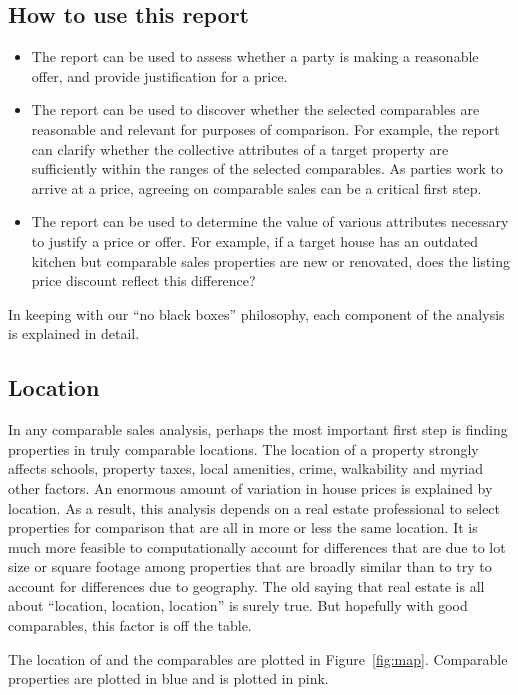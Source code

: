 \documentclass[
12pt, %
letterpaper, %
oneside, %
headinclude,footinclude, %
BCOR5mm, %
]{scrartcl}
\begin{document}
\subsection{How to use this report}
\begin{itemize}
\item The report can be used to assess whether a party is making a reasonable offer, and provide justification for a price. 
\item The report can be used to discover whether the selected comparables are reasonable and relevant for purposes of comparison. 
For example, the report can clarify whether the collective attributes of a target property are sufficiently within the ranges of the selected comparables. As parties work to arrive at a price, agreeing on comparable sales can be a critical first step. 
\item The report can be used to determine the value of various attributes necessary to justify a price or offer. For example, if a target house has an outdated kitchen but comparable sales properties are new or renovated, does the listing price discount reflect this difference? 
\end{itemize} 

In keeping with our ``no black boxes'' philosophy, each component of the analysis is explained in detail. 

\subsection{Location}
In any comparable sales analysis, perhaps the most important first step is finding properties in truly comparable locations.
The location of a property strongly affects schools, property taxes, local amenities, crime, walkability and myriad other factors.
An enormous amount of variation in house prices is explained by location. 
As a result, this analysis depends on a real estate professional to select properties for comparison that are all in more or less the same location.
It is much more feasible to computationally account for differences that are due to lot size or square footage among properties that are broadly similar than to try to account for differences due to geography. 
The old saying that real estate is all about ``location, location, location'' is surely true. But hopefully with good comparables, this factor is off the table.

The location of \PropertyName{} and the comparables are plotted in Figure~\ref{fig:map}.
Comparable properties are plotted in blue and \PropertyName{} is plotted in pink. 
\end{document}
